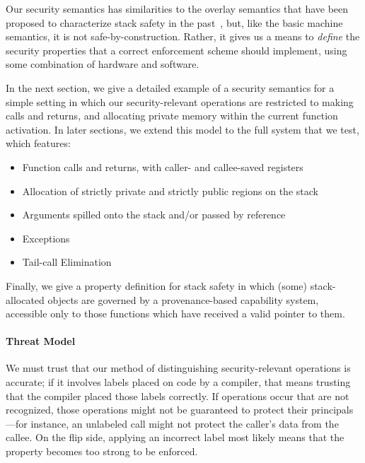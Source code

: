 \documentclass[10pt,conference]{ieeetran}%
\theoremstyle{definition}
\begin{document}
  Our security semantics has similarities to the overlay semantics that have been proposed
  to characterize stack safety in the past~\cite{SkorstengaardSTK}, but, like the basic machine
  semantics, it is not safe-by-construction. Rather, it gives us a means to \emph{define}
  the security properties that a correct enforcement scheme should implement, using
  some combination of hardware and software.
  
In the next section, we give a detailed example of a security semantics for a simple setting
in which our security-relevant operations are restricted to making calls and returns, and allocating
private memory within the current function activation. In later sections, we extend this model
to the full system that we test, which features:
\begin{itemize}
\item Function calls and returns, with caller- and callee-saved registers
\item Allocation of strictly private and strictly public regions on the stack
\item Arguments spilled onto the stack and/or passed by reference
\item Exceptions
\item Tail-call Elimination
\end{itemize}

Finally, we give a property definition for stack safety in which (some) stack-allocated
objects are governed by a provenance-based capability system, accessible only to those
functions which have received a valid pointer to them.


\paragraph*{Threat Model}

We must trust that our method of distinguishing security-relevant operations is accurate; if it
involves labels placed on code by a compiler, that means trusting that the compiler placed
those labels correctly. If operations occur that are not recognized, those operations
might not be guaranteed to protect their principals---for instance, an unlabeled call
might not protect the caller's data from the callee. On the flip side, applying an incorrect
label most likely means that the property becomes too strong to be enforced.
\end{document}
